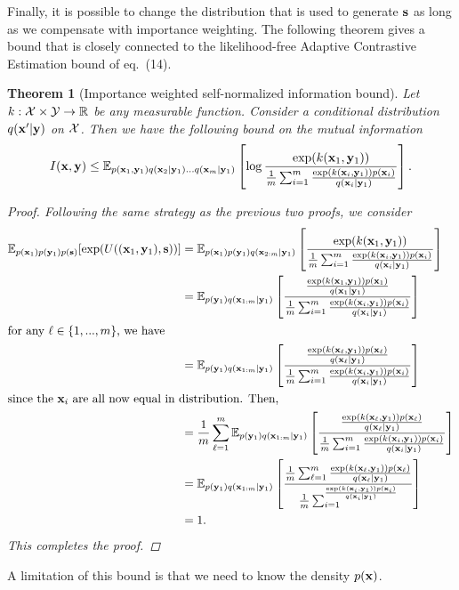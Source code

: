 \documentclass[a4paper, 10pt]{report}
\theoremstyle{plain}
\newtheorem{theorem}{Theorem}[chapter]
\begin{document}
	Finally, it is possible to change the distribution that is used to generate ${\mathbf{s}}$ as long as we compensate with importance weighting. The following theorem gives a bound that is closely connected to the likelihood-free Adaptive Contrastive Estimation bound of \citet{foster2020unified} eq.~(14). 
	\begin{theorem}[Importance weighted self-normalized information bound]
		Let $k:{\mathcal{X}}\times {\mathcal{Y}}\to\mathbb{R}$ be any measurable function. Consider a conditional distribution $q({\mathbf{x}}'|{\mathbf{y}})$ on ${\mathcal{X}}$. Then we have the following bound on the mutual information
		\begin{equation}
		I({\mathbf{x}},{\mathbf{y}}) \le \mathbb{E}_{p({\mathbf{x}}_1,{\mathbf{y}}_1)q({\mathbf{x}}_{2}|{\mathbf{y}}_1)...q({\mathbf{x}}_m|{\mathbf{y}}_1)}\left[ \log \frac{\exp (k({\mathbf{x}}_1,{\mathbf{y}}_1))}{\frac{1}{m} \sum_{i=1}^m \frac{\exp (k({\mathbf{x}}_i,{\mathbf{y}}_1))p({\mathbf{x}}_i)}{q({\mathbf{x}}_i|{\mathbf{y}}_1)} }\right].
		\end{equation}
		\begin{proof}
			Following the same strategy as the previous two proofs, we consider 
			\begin{align}
			\mathbb{E}_{p({\mathbf{x}}_1)p({\mathbf{y}}_1)p({\mathbf{s}})}[\exp(U(({\mathbf{x}}_1,{\mathbf{y}}_1),{\mathbf{s}}))] &= \mathbb{E}_{p({\mathbf{x}}_{1})p({\mathbf{y}}_{1})q({\mathbf{x}}_{2:m}|{\mathbf{y}}_1)}\left[ \frac{\exp (k({\mathbf{x}}_1,{\mathbf{y}}_1))}{\frac{1}{m} \sum_{i=1}^m \frac{\exp (k({\mathbf{x}}_i,{\mathbf{y}}_1))p({\mathbf{x}}_i)}{q({\mathbf{x}}_i|{\mathbf{y}}_1)} }  \right] \\
			&= \mathbb{E}_{p({\mathbf{y}}_{1})q({\mathbf{x}}_{1:m}|{\mathbf{y}}_1)}\left[ \frac{\frac{\exp (k({\mathbf{x}}_1,{\mathbf{y}}_1))p({\mathbf{x}}_1)}{q({\mathbf{x}}_1|{\mathbf{y}}_1)}}{\frac{1}{m} \sum_{i=1}^m \frac{\exp (k({\mathbf{x}}_i,{\mathbf{y}}_1))p({\mathbf{x}}_i)}{q({\mathbf{x}}_i|{\mathbf{y}}_1)} }  \right] \\
			\intertext{for any $\ell\in\{1,...,m\}$, we have}
			&= \mathbb{E}_{p({\mathbf{y}}_{1})q({\mathbf{x}}_{1:m}|{\mathbf{y}}_1)}\left[ \frac{\frac{\exp (k({\mathbf{x}}_\ell,{\mathbf{y}}_1))p({\mathbf{x}}_\ell)}{q({\mathbf{x}}_\ell|{\mathbf{y}}_1)}}{\frac{1}{m} \sum_{i=1}^m \frac{\exp (k({\mathbf{x}}_i,{\mathbf{y}}_1))p({\mathbf{x}}_i)}{q({\mathbf{x}}_i|{\mathbf{y}}_1)} }  \right] \\
			\intertext{since the ${\mathbf{x}}_i$ are all now equal in distribution. Then,}
			&= \frac{1}{m}\sum_{\ell=1}^m\mathbb{E}_{p({\mathbf{y}}_{1})q({\mathbf{x}}_{1:m}|{\mathbf{y}}_1)}\left[ \frac{\frac{\exp (k({\mathbf{x}}_\ell,{\mathbf{y}}_1))p({\mathbf{x}}_\ell)}{q({\mathbf{x}}_\ell|{\mathbf{y}}_1)}}{\frac{1}{m} \sum_{i=1}^m \frac{\exp (k({\mathbf{x}}_i,{\mathbf{y}}_1))p({\mathbf{x}}_i)}{q({\mathbf{x}}_i|{\mathbf{y}}_1)} }  \right] \\
			&= \mathbb{E}_{p({\mathbf{y}}_{1})q({\mathbf{x}}_{1:m}|{\mathbf{y}}_1)}\left[ \frac{\frac{1}{m}\sum_{\ell=1}^m\frac{\exp (k({\mathbf{x}}_\ell,{\mathbf{y}}_1))p({\mathbf{x}}_\ell)}{q({\mathbf{x}}_\ell|{\mathbf{y}}_1)}}{\frac{1}{m} \sum_{i=1}^ \frac{\exp (k({\mathbf{x}}_i,{\mathbf{y}}_1))p({\mathbf{x}}_i)}{q({\mathbf{x}}_i|{\mathbf{y}}_1)} }  \right] \\
			&=1.
			\end{align}
			This completes the proof.
		\end{proof}
	\end{theorem}
	A limitation of this bound is that we need to know the density $p({\mathbf{x}})$.
	
	
	
	
	\clearpage
	
	
	
	
\end{document}
